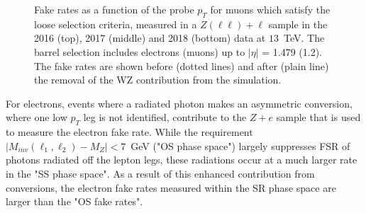 \begin{figure}[!htb]
\begin{center}
\caption{Fake rates as a function of the probe $p_T$ for muons which satisfy the loose selection criteria, measured in
a $Z(\ell\ell)+\ell$ sample in the 2016 (top), 2017 (middle) and 2018 (bottom) data at $13$~TeV.
The barrel selection includes electrons (muons) up to $|\eta|$ = 1.479 (1.2). The fake rates are shown before (dotted lines) and after (plain line) the removal of the WZ contribution from the simulation.
}
\label{fig:fakerates}
\end{center}
\end{figure}

For electrons, events where a radiated photon makes an asymmetric conversion, where one low $p_T$ leg is not identified, contribute to the $Z + e$ sample that is used to measure the electron fake rate. While the requirement $|M_{inv}(\ell_{1},\ell_{2}) - M_{Z}| < 7 $~GeV ("OS phase space") largely suppresses FSR of photons radiated off the lepton legs, these radiations occur at a much larger rate in the "SS phase space". 
As a result of this enhanced
contribution from conversions, the electron fake rates measured
within the SR phase space  are larger than the "OS fake rates".

